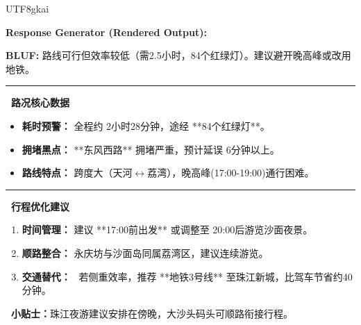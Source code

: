 \documentclass{article} %
\begin{document}
\begin{CJK*}{UTF8}{gkai}
\begin{tcolorbox}[
    breakable,
    enhanced,
    colframe=color_amapblue,
    colback=mycolor,
    coltitle=white,
    title = {\textbf{Case Study: Multi-stop Route Feasibility Check}},
    fonttitle=\bfseries
]
\vspace{5pt}

\textbf{Response Generator (Rendered Output):}
\begin{tcolorbox}[colback=white, colframe=color_amapblue!30!white, arc=4pt, boxrule=1pt, left=4pt, right=4pt, top=4pt, bottom=4pt]
    \small
    \textbf{BLUF:} 路线可行但效率较低（需2.5小时，84个红绿灯）。建议避开晚高峰或改用地铁。
    
    \par\noindent\rule{\textwidth}{0.4pt}
    
    \textbf{\textcolor{color_amapblue}{\faTrafficLight\ 路况核心数据}}
    \begin{itemize}[leftmargin=12pt, itemsep=2pt, topsep=2pt]
        \item \textbf{耗时预警：} 全程约 2小时28分钟，途经 **84个红绿灯**。
        \item \textbf{拥堵黑点：} **东风西路** 拥堵严重，预计延误 6分钟以上。
        \item \textbf{路线特点：} 跨度大（天河$\leftrightarrow$荔湾），晚高峰(17:00-19:00)通行困难。
    \end{itemize}
    
    \par\noindent\rule{\textwidth}{0.4pt}
    
    \textbf{\textcolor{color_amapblue}{\faRoute\ 行程优化建议}}
    \begin{enumerate}[leftmargin=12pt, itemsep=2pt, topsep=2pt]
        \item \textbf{时间管理：} 建议 **17:00前出发** 或调整至 20:00后游览沙面夜景。
        \item \textbf{顺路整合：} 永庆坊与沙面岛同属荔湾区，建议连续游览。
        \item \textbf{交通替代：} \faSubway\ 若侧重效率，推荐 **地铁3号线** 至珠江新城，比驾车节省约40分钟。
    \end{enumerate}
    
    \vspace{3pt}
    
    \colorbox{color_amapgrey}{\parbox{\dimexpr\linewidth-6pt}{
        \scriptsize 
        \textbf{\faClock\ 小贴士：}珠江夜游建议安排在傍晚，大沙头码头可顺路衔接行程。
    }}
\end{tcolorbox}

\end{tcolorbox}




\end{CJK*}
\end{document}
